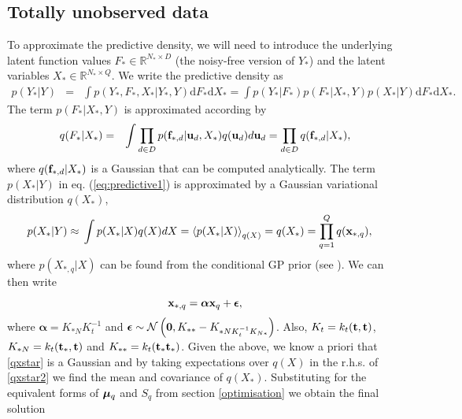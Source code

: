 \documentclass{article} %
\begin{document}
\subsection{Totally unobserved data \label{unobservedData}}
To approximate the predictive density, we will need to introduce the underlying latent function values $F_* \in \mathbb{R}^{N_* \times D}$ (the noisy-free version of $Y_*$) and the latent variables $X_* \in \mathbb{R}^{N_* \times Q}$. We  write the predictive density as
\begin{eqnarray}
p(Y_* | Y) & = & \int p(Y_*, F_*, X_*| Y_*, Y) \text{d} F_* \text{d} X_* =  \int p(Y_* | F_*)  p(F_*|X_*, Y) p(X_*|  Y) \text{d} F_* \text{d} X_* .
\label{eq:predictive1}
\end{eqnarray}
The term $p(F_* |X_*, Y)$ is approximated according by
\begin{eqnarray}
q(F_*|X_*) & = & \int \prod_{d \in D} p(\mathbf{f}_{*,d} | \mathbf{u}_d, X_*)  q(\mathbf{u}_d) d \mathbf{u}_d 
	    = \prod_{d \in D} q(\mathbf{f}_{*,d} | X_*)  ,
\end{eqnarray}
where $q(\mathbf{f}_{*,d} | X_*)$ is a Gaussian that can be computed analytically.%
The term $p(X_*| Y)$ in eq. (\ref{eq:predictive1}) is approximated by
a Gaussian variational distribution $q(X_*)$,
%
\begin{align}
p(X_* | Y) \approx {}& \int  p(X_* | X) q(X) dX = \left\langle  p(X_* | X) \right\rangle_{q(X)} = q(X_*) = \prod_{q=1}^Q q(\mathbf{x}_{*,q}),\label{qxstar}
\end{align}
%
where $p( X_{*,q} | X)$ can be found from the conditional GP prior
(see \cite{rasmussen-williams}). We can then write
%
\begin{equation}
\label{qxstar2}
\mathbf{x}_{*,q} = \boldsymbol \alpha \mathbf{x}_q + \boldsymbol \epsilon,
\end{equation} 
%
where $\boldsymbol \alpha = K_{*N}K_t^{-1}$ and 
$\boldsymbol \epsilon \sim \mathcal{N} \left( \mathbf{0}, K_{**} - K_{*N K_t^{-1} K_{N*}}\right)$. Also, $K_t = k_t(\mathbf{t}, \mathbf{t})$, $K_{*N} = k_t(\mathbf{t}_*, \mathbf{t})$ and $K_{**} = k_t(\mathbf{t}_* \mathbf{t}_*)$. 
Given the above, we know a priori that \eqref{qxstar} is a Gaussian and by taking expectations over $q(X)$ in the r.h.s. of \eqref{qxstar2} we find the mean and covariance of $q(X_*)$. Substituting for the equivalent forms of $\boldsymbol \mu_q$ and $S_q$ from section \ref{optimisation} we obtain the final solution
\end{document}
